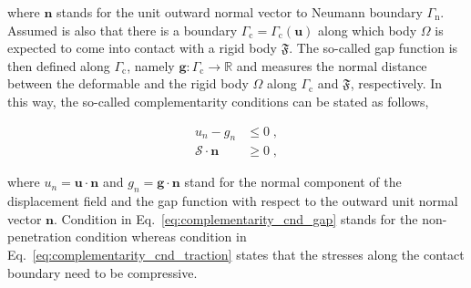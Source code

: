 \documentclass[10pt,a4paper]{article}
\begin{document}
where $\mathbf{n}$ stands for the unit outward normal vector to Neumann boundary $\Gamma_{\text{n}}$.\\

Assumed is also that there is a boundary $\Gamma_{\text{c}} = \Gamma_{\text{c}} (\mathbf{u})$ along which body $\Omega$ is expected to come into contact with a rigid body $\mathfrak{F}$. The so-called gap function is then defined along $\Gamma_{\text{c}}$, namely $\mathbf{g}:\Gamma_{\text{c}} \rightarrow \mathbb{R}$ and measures the normal distance between the deformable and the rigid body $\Omega$ along $\Gamma_{\text{c}}$ and $\mathfrak{F}$, respectively. In this way, the so-called complementarity conditions can be stated as follows,

\begin{subequations}
	\begin{alignat}{1}
		u_n - g_n &\le 0 \;, \label{eq:complementarity_cnd_gap} \\
		\boldsymbol{\mathcal{S}} \cdot \mathbf{n} &\ge 0 \;, \label{eq:complementarity_cnd_traction}
	\end{alignat}
\end{subequations}

where $u_n = \mathbf{u} \cdot \mathbf{n}$ and $g_n = \mathbf{g} \cdot \mathbf{n}$ stand for the normal component of the displacement field and the gap function with respect to the outward unit normal vector $\mathbf{n}$. Condition in Eq.~\eqref{eq:complementarity_cnd_gap} stands for the non-penetration condition whereas condition in Eq.~\eqref{eq:complementarity_cnd_traction} states that the stresses along the contact boundary need to be compressive.
\end{document}
